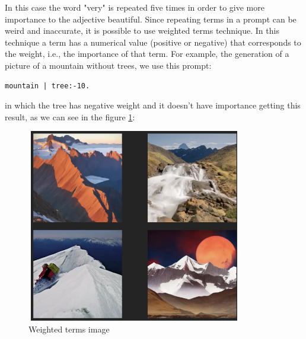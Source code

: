 In this case the word "very" is repeated five times in order to give more importance to the adjective beautiful.
Since repeating terms in a prompt can be weird and inaccurate, it is possible to use weighted terms technique\cite{weighted_terms}. In this technique a term has a numerical value (positive or negative) that corresponds to the weight, i.e., the importance of that term.
For example, the generation of a picture of a mountain without trees, we use this prompt:
\begin{lstlisting}
mountain | tree:-10.
\end{lstlisting}
in which the tree has negative weight and it doesn't have importance getting this result, as we can see in the figure \ref{fig:15}:
\begin{figure}[H]
    \centering
    \includegraphics[width=0.5\linewidth]{Figures/fig_15.png}
    \caption{Weighted terms image}
    \label{fig:15}
\end{figure}

